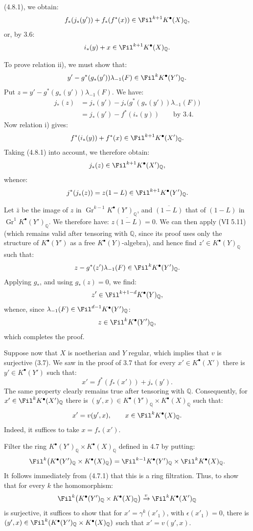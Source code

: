 %
(4.8.1), we obtain:
\[
  f_*(j_*(y'))+f_*(f^*(x))\in\Fil^{k+1}K^{\bullet}(X)_{\mathbb Q},
\]
or, by 3.6:
\[
  i_*(y)+x\in\Fil^{k+1}K^{\bullet}(X)_{\mathbb Q}.
\]

To prove relation ii), we must show that:
\[
  y'-g^*(g_*(y'))\lambda_{-1}(F)\in\Fil^kK^{\bullet}(Y')_{\mathbb Q}.
\]
Put \(z=y'-g^*(g_*(y'))\lambda_{-1}(F)\). We have:
\[
\begin{aligned}
j_*(z)
  &=j_*(y')-j_*\bigl(g^*(g_*(y'))\lambda_{-1}(F)\bigr)\\
  &=j_*(y')-f^*(i_*(y))\qquad\text{by 3.4.}
\end{aligned}
\]
Now relation i) gives:
\[
  f^*(i_*(y))+f^*(x)\in\Fil^{k+1}K^{\bullet}(X')_{\mathbb Q}.
\]
Taking (4.8.1) into account, we therefore obtain:
\[
  j_*(z)\in\Fil^{k+1}K^{\bullet}(X')_{\mathbb Q},
\]
whence:
\[
  j^*(j_*(z))=z(1-L)\in\Fil^{k+1}K^{\bullet}(Y')_{\mathbb Q}.
\]

Let \(\bar z\) be the image of \(z\) in \(\operatorname{Gr}^{k-1}K^{\bullet}(Y')_{\mathbb Q}\), and \(\overline{(1-L)}\) that of \((1-L)\) in \(\operatorname{Gr}^{1}K^{\bullet}(Y')_{\mathbb Q}\). We therefore have: \(\overline{z(1-L)}=0\). We can then apply (VI 5.11) (which remains valid after tensoring with \(\mathbb Q\), since its proof uses only the structure of \(K^{\bullet}(Y')\) as a free \(K^{\bullet}(Y)\)-algebra), and hence find \(z'\in K^{\bullet}(Y)_{\mathbb Q}\) such that:
\[
  z-g^*(z')\lambda_{-1}(F)\in\Fil^kK^{\bullet}(Y')_{\mathbb Q}.
\]
Applying \(g_*\), and using \(g_*(z)=0\), we find:
\[
  z'\in\Fil^{k+1-d}K^{\bullet}(Y)_{\mathbb Q},
\]
whence, since \(\lambda_{-1}(F)\in\Fil^{d-1}K^{\bullet}(Y')_{\mathbb Q}\):
\[
  z\in\Fil^kK^{\bullet}(Y')_{\mathbb Q},
\]
which completes the proof.

%
Suppose now that \(X\) is noetherian and \(Y\) regular, which implies that \(v\) is surjective (3.7). We saw in the proof of 3.7 that for every \(x'\in K^{\bullet}(X')\) there is \(y'\in K^{\bullet}(Y')\) such that:
\[
  x'=f^*(f_*(x'))+j_*(y').
\]
The same property clearly remains true after tensoring with \(\mathbb Q\). Consequently, for \(x'\in\Fil^kK^{\bullet}(X')_{\mathbb Q}\) there is \((y',x)\in K^{\bullet}(Y')_{\mathbb Q}\times K^{\bullet}(X)_{\mathbb Q}\) such that:
\[
  x'=v(y',x),\qquad x\in\Fil^kK^{\bullet}(X)_{\mathbb Q}.
\]
Indeed, it suffices to take \(x=f_*(x')\).

Filter the ring \(K^{\bullet}(Y')_{\mathbb Q}\times K^{\bullet}(X)_{\mathbb Q}\) defined in 4.7 by putting:
\[
  \Fil^k\bigl(K^{\bullet}(Y')_{\mathbb Q}\times K^{\bullet}(X)_{\mathbb Q}\bigr)
  =
  \Fil^{k-1}K^{\bullet}(Y')_{\mathbb Q}\times \Fil^kK^{\bullet}(X)_{\mathbb Q}.
\]
It follows immediately from (4.7.1) that this is a ring filtration. Thus, to show that for every \(k\) the homomorphism:
\[
  \Fil^k\bigl(K^{\bullet}(Y')_{\mathbb Q}\times K^{\bullet}(X)_{\mathbb Q}\bigr)
  \xrightarrow{v}
  \Fil^kK^{\bullet}(X')_{\mathbb Q}
\]
is surjective, it suffices to show that for \(x'= \gamma^k(x'_1)\), with \(\epsilon(x'_1)=0\), there is \((y',x)\in\Fil^k(K^{\bullet}(Y')_{\mathbb Q}\times K^{\bullet}(X)_{\mathbb Q})\) such that \(x'=v(y',x)\).

